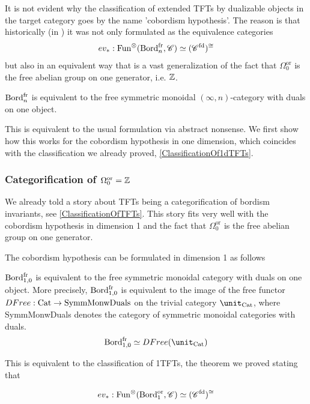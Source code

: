 It is not evident why the classification of extended TFTs by dualizable objects in the target category
goes by the name 'cobordism hypothesis'. The reason is that historically (in \cite{Baez_1995}) it was not
only formulated
 as the equivalence categories
 $$ev_{\ast}:\operatorname{Fun}^{\otimes}(\operatorname{Bord}_{n}^{\operatorname{fr}},\mathscr{C})\simeq (\mathscr{C}^{\operatorname{fd}})^{\cong}$$
 but also in an equivalent way that is a vast generalization of the fact that $\Omega_{0}^{\operatorname{or}}$ is the free
  abelian group on one generator, i.e. $\mathbb{Z}$. 
  \begin{thm}
$\operatorname{Bord}_{n}^{\operatorname{fr}}$ is equivalent to the free symmetric monoidal $(\infty,n)$-category with duals on one object.
  \end{thm}
  This is equivalent to the usual formulation via abstract nonsense. We first show how this works
   for the cobordism hypothesis
  in one dimension, which coincides with the classification we already proved, \ref{ClassificationOf1dTFTs}.
  \subsubsection{Categorification of  \texorpdfstring{$\Omega_{0}^{\operatorname{or}}=\mathbb{Z}$}{0}}\label{FREEBORD1}
  We already told a story about TFTs being a categorification of bordism invariants, see \ref{ClassificationOfTFTs}.
  This story fits very well with the cobordism hypothesis in dimension 1 and the fact that 
  $\Omega_{0}^{\operatorname{or}}$ is the free abelian group on one generator. 
  
  The cobordism hypothesis
  can be formulated in dimension 1 as follows 
  \begin{thm}[Cobordism hypothesis for $n=1$]
$\operatorname{Bord}_{1,0}^{\operatorname{fr}}$ is equivalent to the free symmetric monoidal category with duals on one object. More precisely,
$\operatorname{Bord}_{1,0}^{\operatorname{fr}}$ is equivalent to the image of the free functor $DFree:\operatorname{Cat}\to\operatorname{SymmMonwDuals}$
on the trivial category $\unit_{\Cat}$, where SymmMonwDuals denotes the category of symmetric monoidal categories
with duals. 
$$\Bord_{1,0}^{\fr}\simeq DFree(\unit_{\Cat})$$
  \end{thm}
This is equivalent to the classification of 1TFTs, the theorem we proved stating that 
\begin{thm}
$$ev_{\ast}:\operatorname{Fun}^{\otimes}(\operatorname{Bord}_{1}^{\operatorname{or}},\mathscr{C})\simeq (\mathscr{C}^{\operatorname{fd}})^{\cong}$$
\end{thm}
 
